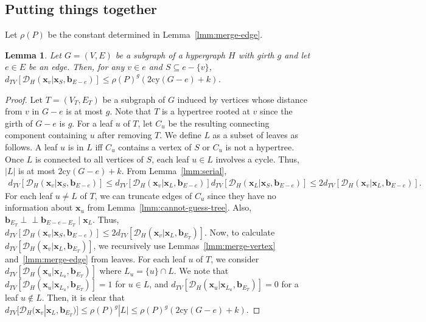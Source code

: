 \documentclass[letterpaper,11pt]{article}
\newtheorem{lemma}[theorem]{Lemma}
\newcommand{\dtv}{d_{TV}}
\newcommand{\cald}{\mathcal{D}}
\newcommand{\cy}{\mathrm{cy}}
\newcommand{\bfx}{\mathbf{x}}
\newcommand{\bfb}{\mathbf{b}}
\newcommand{\ci}{\perp\!\!\!\perp}
\begin{document}
\subsection{Putting things together}
Let $\rho(P)$ be the constant determined in Lemma~\ref{lmm:merge-edge}.
\begin{lemma}\label{lmm:E+S-to-v}
  Let $G=(V,E)$ be a subgraph of a hypergraph $H$ with girth $g$ and let $e\in E$ be an edge.
  Then, for any $v\in e$ and $S\subseteq e-\{v\}$, $\dtv[\cald_H(\bfx_v|\bfx_S,\bfb_{E-e})]\leq \rho(P)^{g}(2\cy(G-e)+k)$.
\end{lemma}
\begin{proof}
  Let $T=(V_T,E_T)$ be a subgraph of $G$ induced by vertices whose distance from $v$ in $G-e$ is at most $g$.
  Note that $T$ is a hypertree rooted at $v$ since the girth of $G-e$ is $g$.
  For a leaf $u$ of $T$, let $C_u$ be the resulting connecting component containing $u$ after removing $T$.
  We define $L$ as a subset of leaves as follows.
  A leaf $u$ is in $L$ iff $C_u$ contains a vertex of $S$ or $C_u$ is not a hypertree.
  Once $L$ is connected to all vertices of $S$, 
  each leaf $u\in L$ involves a cycle.
  Thus, $|L|$ is at most $2\cy(G-e)+k$.
  From Lemma~\ref{lmm:serial}, 
  \begin{eqnarray*}
    \dtv[\cald_H(\bfx_v|\bfx_S,\bfb_{E-e})]\leq \dtv[\cald_H(\bfx_v|\bfx_L,\bfb_{E-e})]\dtv[\cald_H(\bfx_L|\bfx_S,\bfb_{E-e})] \leq 2\dtv[\cald_H(\bfx_v|\bfx_L,\bfb_{E-e})].
  \end{eqnarray*}
  For each leaf $u\neq L$ of $T$, 
  we can truncate edges of $C_u$ since they have no information about $\bfx_u$ from Lemma~\ref{lmm:cannot-guess-tree}.
  Also, $\bfb_{E_T} \ci \bfb_{E-e-E_T} \mid \bfx_L$.
  Thus, \( \dtv[\cald_H(\bfx_v|\bfx_S,\bfb_{E-e})] \leq 2\dtv[\cald_H(\bfx_v|\bfx_L,\bfb_{E_T})] \).
  Now, to calculate $\dtv[\cald_H(\bfx_v|\bfx_{L},\bfb_{E_T})]$, 
  we recursively use Lemmas~\ref{lmm:merge-vertex} and~\ref{lmm:merge-edge} from leaves.
  For each leaf $u$ of $T$, 
  we consider $\dtv[\cald_H(\bfx_u|\bfx_{L_u},\bfb_{E_T})]$ where $L_u=\{u\}\cap L$.
  We note that \(\dtv[\cald_H(\bfx_u|\bfx_{L_u},\bfb_{E_T})]=1\) for $u\in L$,
  and \(\dtv[\cald_H(\bfx_u|\bfx_{L_u},\bfb_{E_T})]=0\) for a leaf $u\not \in L$.
  Then, it is clear that \( \dtv[\cald_H(\bfx_v|\bfx_{L},\bfb_{E_T})] \leq \rho(P)^g|L|\leq \rho(P)^g(2\cy(G-e)+k)\).
\end{proof}
\end{document}
